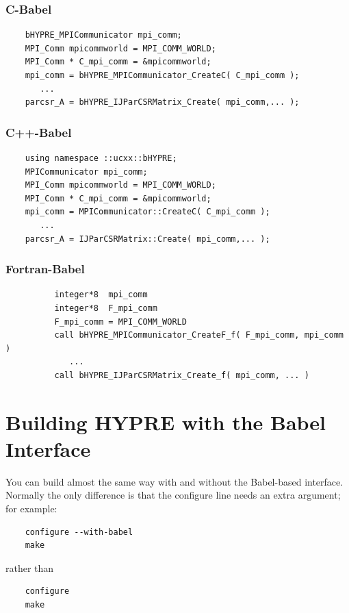 \subsubsection{C-Babel}
\begin{verbatim}
    bHYPRE_MPICommunicator mpi_comm;
    MPI_Comm mpicommworld = MPI_COMM_WORLD;
    MPI_Comm * C_mpi_comm = &mpicommworld;
    mpi_comm = bHYPRE_MPICommunicator_CreateC( C_mpi_comm );
       ...
    parcsr_A = bHYPRE_IJParCSRMatrix_Create( mpi_comm,... );
\end{verbatim}

\subsubsection{C++-Babel}
\begin{verbatim}
    using namespace ::ucxx::bHYPRE;
    MPICommunicator mpi_comm;
    MPI_Comm mpicommworld = MPI_COMM_WORLD;
    MPI_Comm * C_mpi_comm = &mpicommworld;
    mpi_comm = MPICommunicator::CreateC( C_mpi_comm );
       ...
    parcsr_A = IJParCSRMatrix::Create( mpi_comm,... );
\end{verbatim}

\subsubsection{Fortran-Babel}
\begin{verbatim}
          integer*8  mpi_comm
          integer*8  F_mpi_comm
          F_mpi_comm = MPI_COMM_WORLD
          call bHYPRE_MPICommunicator_CreateF_f( F_mpi_comm, mpi_comm )
             ...
          call bHYPRE_IJParCSRMatrix_Create_f( mpi_comm, ... )
\end{verbatim}

\section{Building HYPRE with the Babel Interface}

You can build \hypre{} almost the same way with and without the
Babel-based interface.  Normally the only difference is that the
configure line needs an extra argument; for example:

\begin{verbatim}
    configure --with-babel
    make
\end{verbatim}
rather than
\begin{verbatim}
    configure
    make
\end{verbatim}

